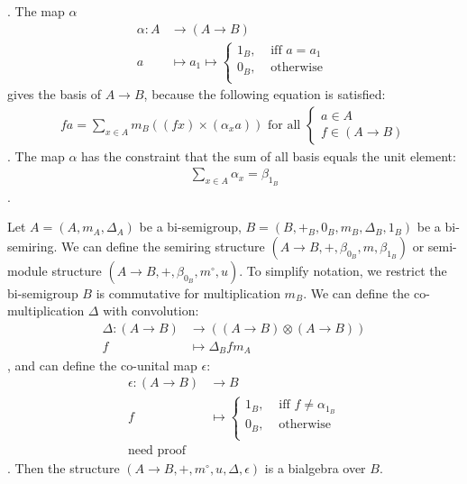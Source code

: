 . The map $\alpha$
\begin{equation}\begin{split}
	\alpha: A &\to (A \to B) \\
		a &\mapsto a_1 \mapsto \begin{cases}
			1_B, &\text{ iff } a = a_1 \\
			0_B, &\text{ otherwise } \\
		\end{cases}
\end{split}\end{equation}
gives the basis of $A\to B$, because the following equation is satisfied:
\begin{equation}\begin{split}
	fa = \sum_{x\in A} m_B((fx) \times (\alpha_x a)) \text{ for all } \begin{cases}
		a\in A \\
		f\in (A \to B)
	\end{cases}
\end{split}\end{equation}
. The map $\alpha$ has the constraint that the sum of all basis equals the
unit element:
\begin{equation}\begin{split}
	\sum_{x\in A} \alpha_x = \beta_{1_B}
\end{split}\end{equation}
.

Let $A=(A,m_A,\Delta_A)$ be a bi-semigroup, $B=(B,+_B,0_B,m_B,\Delta_B,1_B)$
be a bi-semiring. We can define the semiring structure 
$(A\to B,+,\beta_{0_B},m,\beta_{1_B})$ or semi-module structure 
$(A\to B,+,\beta_{0_B},m^\circ,u)$. To simplify notation, we restrict 
the bi-semigroup $B$ is commutative for multiplication $m_B$.
We can define the co-multiplication $\Delta$ with convolution:
\begin{equation}\begin{split}
	\Delta: (A \to B) &\to ((A \to B) \otimes (A \to B)) \\
		f &\mapsto \Delta_B f m_A
\end{split}\end{equation}
, and can define the co-unital map $\epsilon$:
\begin{equation}\begin{split}
	\epsilon: (A \to B) &\to B \\
		f &\mapsto \begin{cases}
			1_B, &\text{ iff } f \neq \alpha_{1_B} \\
			0_B, &\text{ otherwise } \\
		\end{cases} \\
		\text{need proof}
\end{split}\end{equation}
. Then the structure $(A\to B,+,m^\circ,u,\Delta,\epsilon)$ is a bialgebra
over $B$.


